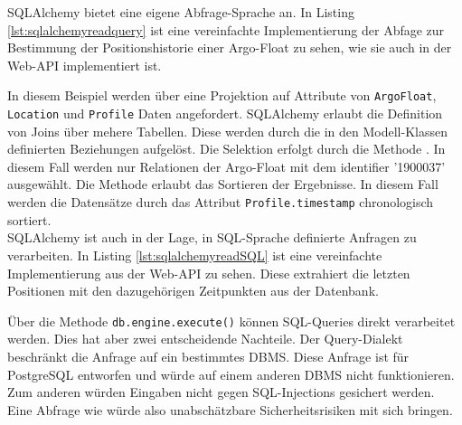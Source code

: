 SQLAlchemy bietet eine eigene Abfrage-Sprache an. In Listing \ref{lst:sqlalchemyreadquery} ist eine vereinfachte Implementierung der Abfage zur Bestimmung der Positionshistorie einer Argo-Float zu sehen, wie sie auch in der Web-API implementiert ist. 



In diesem Beispiel werden über eine Projektion auf Attribute von \texttt{ArgoFloat}, \texttt{Location} und \texttt{Profile} Daten angefordert. SQLAlchemy erlaubt die Definition von Joins über mehere Tabellen. Diese werden durch die in den Modell-Klassen definierten Beziehungen aufgelöst. Die Selektion erfolgt durch die Methode . In diesem Fall werden nur Relationen der Argo-Float mit dem identifier '1900037' ausgewählt. Die Methode  erlaubt das Sortieren der Ergebnisse. In diesem Fall werden die Datensätze durch das Attribut \texttt{Profile.timestamp} chronologisch sortiert.
\\

SQLAlchemy ist auch in der Lage, in SQL-Sprache definierte Anfragen zu verarbeiten. In Listing \ref{lst:sqlalchemyreadSQL} ist eine vereinfachte Implementierung aus der Web-API zu sehen. Diese extrahiert die letzten Positionen mit den dazugehörigen Zeitpunkten aus der Datenbank. 

    
Über die Methode \texttt{db.engine.execute()} können SQL-Queries direkt verarbeitet werden. Dies hat aber zwei entscheidende Nachteile. Der Query-Dialekt beschränkt die Anfrage auf ein bestimmtes DBMS. Diese Anfrage ist für PostgreSQL entworfen und würde auf einem anderen DBMS nicht funktionieren. Zum anderen würden Eingaben nicht gegen SQL-Injections gesichert werden. Eine Abfrage wie 
 würde also unabschätzbare Sicherheitsrisiken mit sich bringen.
\\




